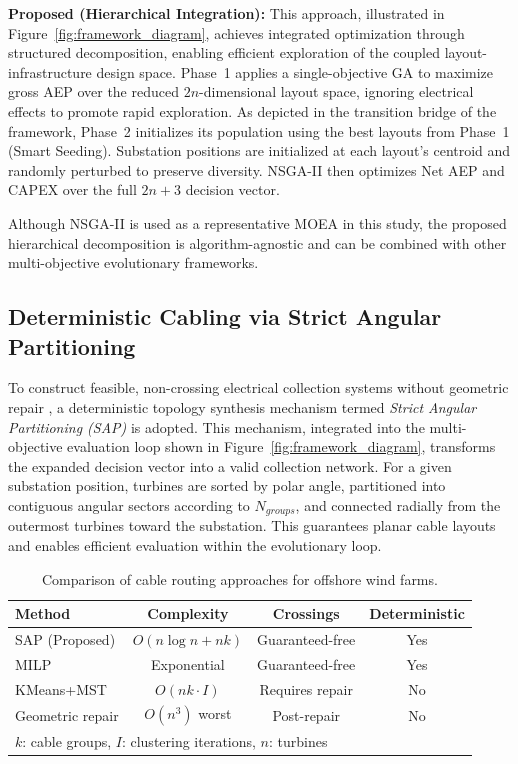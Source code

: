 \documentclass[format=sigconf,anonymous=true,review=true]{acmart}
\begin{document}
\textbf{Proposed (Hierarchical Integration):} 
This approach, illustrated in Figure~\ref{fig:framework_diagram}, achieves integrated optimization through structured decomposition, enabling efficient exploration of the coupled layout-infrastructure design space. 
Phase~1 applies a single-objective GA to maximize gross AEP over the reduced $2n$-dimensional layout space, ignoring electrical effects to promote rapid exploration.  
As depicted in the transition bridge of the framework, Phase~2 initializes its population using the best layouts from Phase~1 (Smart Seeding). Substation positions are initialized at each layout’s centroid and randomly perturbed to preserve diversity. NSGA-II then optimizes Net AEP and CAPEX over the full $2n+3$ decision vector.

Although NSGA-II is used as a representative MOEA in this study, the proposed hierarchical decomposition is algorithm-agnostic and can be combined with other multi-objective evolutionary frameworks.

\subsection{Deterministic Cabling via Strict Angular Partitioning}

To construct feasible, non-crossing electrical collection systems without geometric repair \cite{Alencar2026Flexible, Ye2023Path}, a deterministic topology synthesis mechanism termed \textit{Strict Angular Partitioning (SAP)} is adopted.  This mechanism, integrated into the multi-objective evaluation loop shown in Figure~\ref{fig:framework_diagram}, transforms the expanded decision vector into a valid collection network. For a given substation position, turbines are sorted by polar angle, partitioned into contiguous angular sectors according to $N_{groups}$, and connected radially from the outermost turbines toward the substation.  
This guarantees planar cable layouts and enables efficient evaluation within the evolutionary loop.

\begin{table}[htbp]
\caption{Comparison of cable routing approaches for offshore wind farms.}
\label{tab:routing_comparison}
\centering
\small
\begin{tabular}{lccc}
\toprule
\textbf{Method} & \textbf{Complexity} & \textbf{Crossings} & \textbf{Deterministic} \\
\midrule
SAP (Proposed) & $O(n \log n + nk)$ & Guaranteed-free & Yes \\
MILP \cite{fischetti2023integrated, Fischetti2015MILP} & Exponential & Guaranteed-free & Yes \\
KMeans+MST \cite{Machado2024Hybrid} & $O(nk \cdot I)$ & Requires repair & No \\
Geometric repair \cite{Alencar2026Flexible} & $O(n^3)$ worst & Post-repair & No \\
\bottomrule
\multicolumn{4}{l}{\footnotesize $k$: cable groups, $I$: clustering iterations, $n$: turbines}
\end{tabular}
\end{table}
\end{document}
